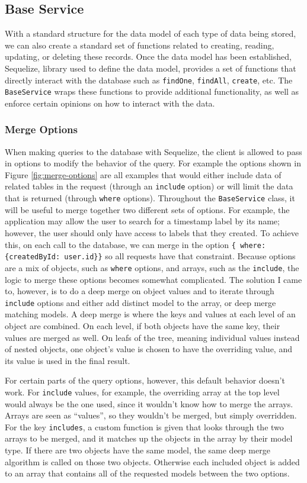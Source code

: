 \subsection{Base Service}
With a standard structure for the data model of each type of data being stored, we can also create a standard set of functions related to creating, reading, updating, or deleting these records.  Once the data model has been established, Sequelize, library used to define the data model, provides a set of functions that directly interact with the database such as \verb!findOne!, \verb!findAll!, \verb!create!, etc.  The \verb!BaseService! wraps these functions to provide additional functionality, as well as enforce certain opinions on how to interact with the data.

\subsubsection{Merge Options}
When making queries to the database with Sequelize, the client is allowed to pass in options to modify the behavior of the query.  For example the options shown in Figure \ref{fig:merge-options} are all examples that would either include data of related tables in the request (through an \verb!include! option) or will limit the data that is returned (through \verb!where! options).  Throughout the \verb!BaseService! class, it will be useful to merge together two different sets of options.  For example, the application may allow the user to search for a timestamp label by its name; however, the user should only have access to labels that they created.  To achieve this, on each call to the database, we can merge in the option \verb!{ where: {createdById: user.id}}! so all requests have that constraint.  Because options are a mix of objects, such as \verb!where! options, and arrays, such as the \verb!include!, the logic to merge these options becomes somewhat complicated.  The solution I came to, however, is to do a deep merge on object values and to iterate through \verb!include! options and either add distinct model to the array, or deep merge matching models.  A deep merge is where the keys and values at each level of an object are combined. On each level, if both objects have the same key, their values are merged as well.  On leafs of the tree, meaning individual values instead of nested objects, one object's value is chosen to have the overriding value, and its value is used in the final result.

For certain parts of the query options, however, this default behavior doesn't work.  For \verb!include! values, for example, the overriding array at the top level would always be the one used, since it wouldn't know how to merge the arrays. Arrays are seen as ``values'', so they wouldn't be merged, but simply overridden.  For the key \verb!includes!, a custom function is given that looks through the two arrays to be merged, and it matches up the objects in the array by their model type.  If there are  two objects have the same model, the same deep merge algorithm is called on those two objects.  Otherwise each included object is added to an array that contains all of the requested models between the two options.

